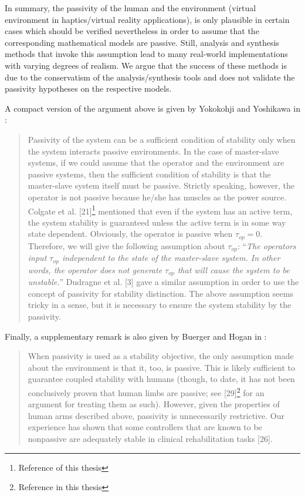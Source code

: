 In summary, the passivity of the human and the environment (virtual environment in haptics/virtual reality applications), is 
only plausible in certain cases which should be verified nevertheless in order to assume that the corresponding mathematical models 
are passive. Still, analysis and synthesis methods that invoke this assumption lead to many real-world implementations 
with varying degrees of realism. We argue that the success of these methods is due to the conservatism of the analysis/synthesis tools
and does not validate the passivity hypotheses on the respective models.


A compact version of the argument above is given by Yokokohji and Yoshikawa in \cite{yokokohjiyoshikawa}: 
\begin{quote}
Passivity of the system can be a
sufficient condition of stability only when the system interacts
passive environments. In the case of master-slave systems, if
we could assume that the operator and the environment are
passive systems, then the sufficient condition of stability is
that the master-slave system itself must be passive. Strictly
speaking, however, the operator is not passive because he/she
has muscles as the power source. Colgate et al. [21]\footnote{Reference 
\cite{colgatehogan88} of this thesis} mentioned
that even if the system has an active term, the system stability
is guaranteed unless the active term is in some way state dependent.
Obviously, the operator is passive when $\tau_{op}= 0$.
Therefore, we will give the following assumption about $\tau_{op}$:
\enquote{\emph{The operators input $\tau_{op}$ independent to the state of the
master-slave system. In other words, the operator does not
generate $\tau_{op}$ that will cause the system to be unstable.}}
Dudragne et al. [3] gave a similar assumption in order to use
the concept of passivity for stability distinction. The above
assumption seems tricky in a sense, but it is necessary to ensure
the system stability by the passivity.
\end{quote}

\noindent Finally, a supplementary remark is also given by Buerger and Hogan in \cite{buergerhogan1}: 
\begin{quote}
When passivity is used as a stability objective, the only assumption
made about the environment is that it, too, is passive.
This is likely sufficient to guarantee coupled stability with humans
(though, to date, it has not been conclusively proven that
human limbs are passive; see [29]\footnote{Reference \cite{hogan89} in this thesis} for an argument for treating
them as such). However, given the properties of human arms
described above, passivity is unnecessarily restrictive. Our experience
has shown that some controllers that are known to be
nonpassive are adequately stable in clinical rehabilitation tasks [26].
\end{quote}



